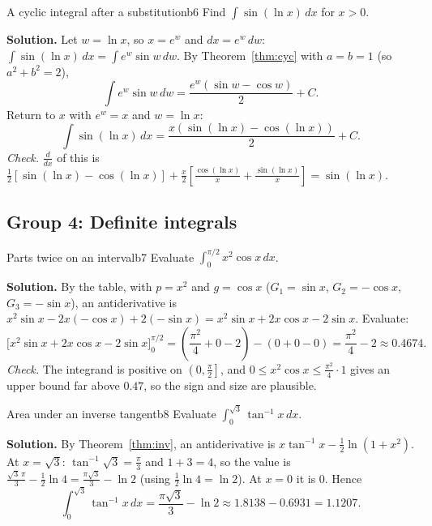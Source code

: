 \documentclass[11pt]{article}
\begin{document}
\begin{exmp}{A cyclic integral after a substitution}{b6}
Find $\int\sin(\ln x)\,dx$ for $x>0$.

\textbf{Solution.} Let $w=\ln x$, so $x=e^w$ and $dx=e^w\,dw$: $\int\sin(\ln x)\,dx=\int e^w\sin w\,dw$. By Theorem~\ref{thm:cyc} with $a=b=1$ (so $a^2+b^2=2$),
\[\int e^w\sin w\,dw=\frac{e^w(\sin w-\cos w)}2+C .\]
Return to $x$ with $e^w=x$ and $w=\ln x$:
\[\int\sin(\ln x)\,dx=\frac{x\left(\sin(\ln x)-\cos(\ln x)\right)}2+C .\]
\emph{Check.} $\frac{d}{dx}$ of this is $\frac12\left[\sin(\ln x)-\cos(\ln x)\right]+\frac x2\left[\frac{\cos(\ln x)}x+\frac{\sin(\ln x)}x\right]=\sin(\ln x)$.
\end{exmp}

\subsection*{Group 4: Definite integrals}

\begin{exmp}{Parts twice on an interval}{b7}
Evaluate $\int_0^{\pi/2}x^2\cos x\,dx$.

\textbf{Solution.} By the table, with $p=x^2$ and $g=\cos x$ ($G_1=\sin x$, $G_2=-\cos x$, $G_3=-\sin x$), an antiderivative is $x^2\sin x-2x(-\cos x)+2(-\sin x)=x^2\sin x+2x\cos x-2\sin x$. Evaluate:
\[\Big[x^2\sin x+2x\cos x-2\sin x\Big]_0^{\pi/2}=\left(\frac{\pi^2}4+0-2\right)-(0+0-0)=\frac{\pi^2}4-2\approx0.4674 .\]
\emph{Check.} The integrand is positive on $\left(0,\frac\pi2\right]$, and $0\le x^2\cos x\le\frac{\pi^2}4\cdot1$ gives an upper bound far above $0.47$, so the sign and size are plausible.
\end{exmp}

\begin{exmp}{Area under an inverse tangent}{b8}
Evaluate $\int_0^{\sqrt3}\tan^{-1}x\,dx$.

\textbf{Solution.} By Theorem~\ref{thm:inv}, an antiderivative is $x\tan^{-1}x-\frac12\ln\left(1+x^2\right)$. At $x=\sqrt3$: $\tan^{-1}\sqrt3=\frac\pi3$ and $1+3=4$, so the value is $\frac{\sqrt3\,\pi}3-\frac12\ln4=\frac{\pi\sqrt3}3-\ln2$ (using $\frac12\ln4=\ln2$). At $x=0$ it is $0$. Hence
\[\int_0^{\sqrt3}\tan^{-1}x\,dx=\frac{\pi\sqrt3}3-\ln2\approx1.8138-0.6931=1.1207 .\]
\end{exmp}
\end{document}
